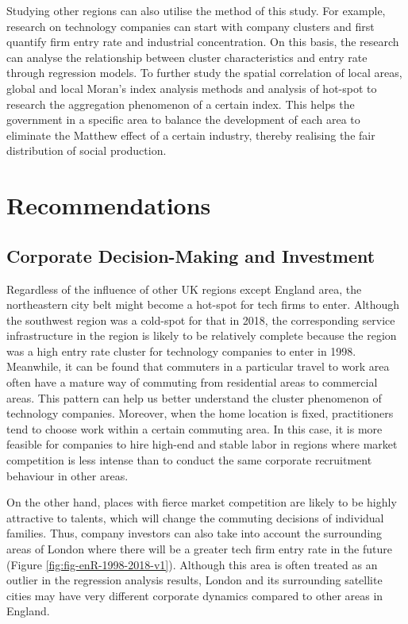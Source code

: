 \documentclass[
  12pt,
  oneside]{book}
\begin{document}
Studying other regions can also utilise the method of this study. For example, research on technology companies can start with company clusters and first quantify firm entry rate and industrial concentration. On this basis, the research can analyse the relationship between cluster characteristics and entry rate through regression models. To further study the spatial correlation of local areas, global and local Moran's index analysis methods and analysis of hot-spot to research the aggregation phenomenon of a certain index. This helps the government in a specific area to balance the development of each area to eliminate the Matthew effect of a certain industry, thereby realising the fair distribution of social production.

\hypertarget{recommendations}{%
\section{Recommendations}\label{recommendations}}

\hypertarget{corporate-decision-making-and-investment}{%
\subsection{Corporate Decision-Making and Investment}\label{corporate-decision-making-and-investment}}

Regardless of the influence of other UK regions except England area, the northeastern city belt might become a hot-spot for tech firms to enter. Although the southwest region was a cold-spot for that in 2018, the corresponding service infrastructure in the region is likely to be relatively complete because the region was a high entry rate cluster for technology companies to enter in 1998. Meanwhile, it can be found that commuters in a particular travel to work area often have a mature way of commuting from residential areas to commercial areas. This pattern can help us better understand the cluster phenomenon of technology companies. Moreover, when the home location is fixed, practitioners tend to choose work within a certain commuting area. In this case, it is more feasible for companies to hire high-end and stable labor in regions where market competition is less intense than to conduct the same corporate recruitment behaviour in other areas.

On the other hand, places with fierce market competition are likely to be highly attractive to talents, which will change the commuting decisions of individual families. Thus, company investors can also take into account the surrounding areas of London where there will be a greater tech firm entry rate in the future (Figure \ref{fig:fig-enR-1998-2018-v1}). Although this area is often treated as an outlier in the regression analysis results, London and its surrounding satellite cities may have very different corporate dynamics compared to other areas in England.
\end{document}
